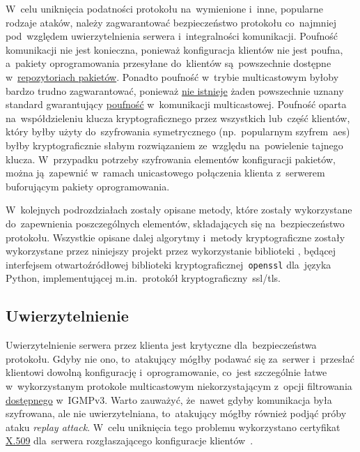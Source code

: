 \documentclass[thesis]{subfiles}
\begin{document}
W~celu uniknięcia podatności protokołu na~wymienione i~inne, popularne rodzaje ataków, należy zagwarantować bezpieczeństwo protokołu co~najmniej pod~względem uwierzytelnienia serwera i~integralności komunikacji. Poufność komunikacji nie jest konieczna, ponieważ konfiguracja klientów nie jest poufna, a~pakiety oprogramowania przesyłane do~klientów są~powszechnie dostępne w~\href{https://wiki.archlinux.org/index.php/official_repositories}{repozytoriach pakietów}. Ponadto poufność w~trybie multicastowym byłoby bardzo trudno zagwarantować, ponieważ \href{https://www.google.pl/search?q=multicast+encryption}{nie istnieje} żaden powszechnie uznany standard gwarantujący \href{http://www.cisco.com/c/dam/en/us/products/collateral/ios-nx-os-software/ip-multicast/prod_presentation0900aecd80473105.pdf}{poufność} w~komunikacji multicastowej. Poufność oparta na~współdzieleniu klucza kryptograficznego przez wszystkich lub~część klientów, który byłby użyty do~szyfrowania symetrycznego (np.~popularnym szyfrem~\gls{aes}) byłby kryptograficznie słabym rozwiązaniem ze~względu na~powielenie tajnego klucza. W~przypadku potrzeby szyfrowania elementów konfiguracji pakietów, można ją~zapewnić w~ramach unicastowego połączenia klienta z~serwerem buforującym pakiety oprogramowania.

W~kolejnych podrozdziałach zostały opisane metody, które zostały wykorzystane do~zapewnienia poszczególnych elementów, składających się na~bezpieczeństwo protokołu. Wszystkie opisane dalej algorytmy i~metody kryptograficzne zostały wykorzystane przez niniejszy projekt przez wykorzystanie biblioteki , będącej interfejsem otwartoźródłowej biblioteki kryptograficznej~\texttt{\gls{openssl}} dla~języka Python, implementującej m.in.~protokół kryptograficzny~\gls{ssl/tls}.


\subsection{Uwierzytelnienie}

Uwierzytelnienie serwera przez klienta jest krytyczne dla~bezpieczeństwa protokołu. Gdyby nie ono, to~atakujący mógłby podawać się za~serwer i~przesłać klientowi dowolną konfigurację i~oprogramowanie, co~jest szczególnie łatwe w~wykorzystanym protokole multicastowym niekorzystającym z~opcji filtrowania \hyperlink{igmpv3-filtering}{dostępnego} w~IGMPv3. Warto zauważyć, że~nawet gdyby komunikacja była szyfrowana, ale nie uwierzytelniana, to~atakujący mógłby również podjąć próby ataku \emph{replay attack}. W~celu uniknięcia tego problemu wykorzystano certyfikat \href{https://en.wikipedia.org/wiki/X.509}{X.509} dla~serwera rozgłaszającego konfiguracje klientów~\cite{wiki:x509}.
\end{document}
